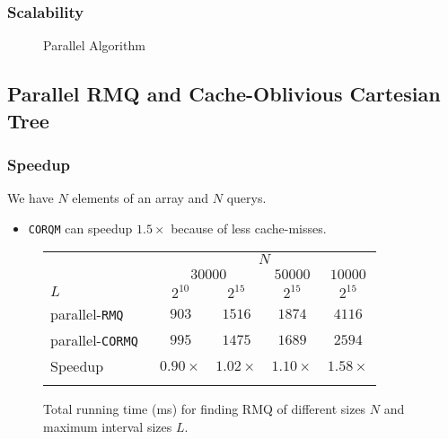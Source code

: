 \begin{frame}
	\frametitle{Scalability}
	\begin{figure}[!ht]
		\centering
		\subfigure[Scalability]{
			
			\label{fig:fig-parallel}
		}
		\caption{Parallel Algorithm}
	\end{figure}
\end{frame}

\subsection{Parallel RMQ and Cache-Oblivious Cartesian Tree}
\begin{frame}
	\frametitle{Speedup}
	We have $N$ elements of an array and $N$ querys.
	\begin{itemize}
		\setlength\itemsep{1em}
		\item \texttt{CORQM} can speedup $1.5\times$ because of less cache-misses.
	\end{itemize}
	\begin{figure}[!ht]
		\begin{center}
			\begin{tabular}{l c c c c}
				\firsthline
					& \multicolumn{4}{c}{$N$} \\
					\cline{2-5}
						& \multicolumn{2}{c}{$30000$} & $50000$ & $10000$ \\
					$L$ & $2^{10}$ & $2^{15}$ & $2^{15}$ & $2^{15}$ \\
					\hline
					parallel-\tt{RMQ}   & $903$ & $1516$ & $1874$ & $4116$ \\
					parallel-\tt{CORMQ} & $995$ & $1475$ & $1689$ & $2594$ \\
					\hline
					Speedup & $0.90\times$ & $1.02\times$ & $1.10\times$ & $1.58\times$\\
				\lasthline
			\end{tabular}
			\caption{Total running time (ms) for finding RMQ of different sizes $N$ and maximum interval sizes $L$.}
			\label{fig:CORMQ}
		\end{center}
	\end{figure}
\end{frame}